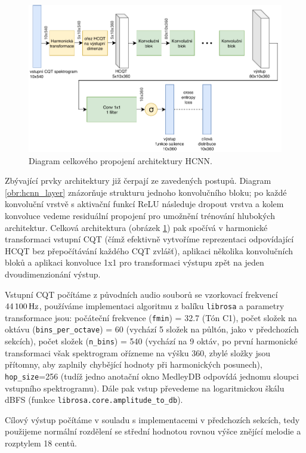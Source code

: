 \begin{figure}[h]\centering
    \includegraphics[width=\textwidth,height=\textheight,keepaspectratio]{../img/hcnn_arch}
\caption{Diagram celkového propojení architektury HCNN.}\label{obr:hcnn_arch}
\end{figure}

Zbývající prvky architektury již čerpají ze zavedených postupů. Diagram \ref{obr:hcnn_layer} znázorňuje strukturu jednoho konvolučního bloku; po každé konvoluční vrstvě s aktivační funkcí ReLU následuje dropout vrstva a kolem konvoluce vedeme residuální propojení pro umožnění trénování hlubokých architektur. Celková architektura (obrázek \ref{obr:hcnn_arch}) pak spočívá v harmonické transformaci vstupní CQT (čímž efektivně vytvoříme reprezentaci odpovídající HCQT bez přepočítávání každého CQT zvlášť), aplikaci několika konvolučních bloků a aplikaci konvoluce 1x1 pro transformaci výstupu zpět na jeden dvoudimenzionání výstup.

Vstupní CQT počítáme z původních audio souborů se vzorkovací frekvencí $44\,100\,\rm Hz$, používáme implementaci algoritmu z balíku \texttt{librosa} a parametry transformace jsou: počáteční frekvence (\texttt{fmin}) = 32.7 (Tón C1), počet složek na oktávu (\texttt{bins\_per\_octave}) = 60 (vychází 5 složek na půltón, jako v předchozích sekcích), počet složek (\texttt{n\_bins}) = 540 (vychází na 9 oktáv, po první harmonické transformaci však spektrogram ořízneme na výšku 360, zbylé složky jsou přítomny, aby zaplnily chybějící hodnoty při harmonických posunech), \texttt{hop\_size}=256 (tudíž jedno anotační okno MedleyDB odpovídá jednomu sloupci vstupního spektrogramu). Dále pak vstup převedeme na logaritmickou škálu dBFS (funkce \texttt{librosa.core.amplitude\_to\_db}).

Cílový výstup počítáme v souladu s implementacemi v předchozích sekcích, tedy použijeme normální rozdělení se střední hodnotou rovnou výšce znějící melodie a rozptylem 18 centů.

